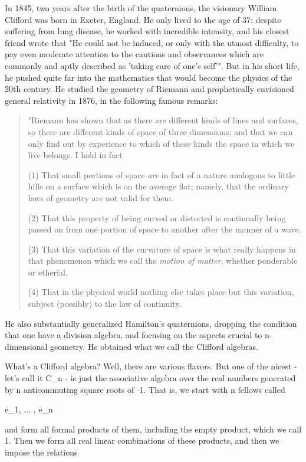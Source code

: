 In 1845, two years after the birth of the quaternions, the visionary
William Clifford was born in Exeter, England.  He only lived to
the age of 37: despite suffering from lung disease, he worked with
incredible intensity, and his closest friend wrote that "He could
not be induced, or only with the utmost difficulty, to pay even
moderate attention to the cautions and observances which are commonly
and aptly described as 'taking care of one's self'".  But
in his short life, he pushed quite far into the mathematics that
would become the physics of the 20th century.  He studied the geometry
of Riemann and prophetically envisioned general relativity in 1876, in
the following famous remarks:

\begin{quote}
"Riemann has shown that as there are different kinds of lines and
surfaces, so there are different kinds of space of three dimensions; and
that we can only find out by experience to which of these kinds the
space in which we live belongs.  I hold in fact

(1) That small portions of space \emph{are} in fact of a nature analogous
to little hills on a surface which is on the average flat; namely, that
the ordinary laws of geometry are not valid for them.

(2)  That this property of being curved or distorted is continually
being passed on from one portion of space to another after the manner of
a wave.

(3)  That this variation of the curvature of space is what really
happens in that phenomenon which we call the \emph{motion of matter},
whether ponderable or etherial.

(4)  That in the physical world nothing else takes place but this
variation, subject (possibly) to the law of continuity. 

\end{quote}
He also substantially generalized Hamilton's quaternions, dropping the
condition that one have a division algebra, and focusing on the aspects
crucial to n-dimensional geometry.  He obtained what we call the
Clifford algebras.  

What's a Clifford algebra?  Well, there are various flavors.  But one of
the nicest - let's call it C_{n} - is just the associative algebra
over the real numbers generated by n anticommuting square roots of -1.
That is, we start with n fellows called

e_{1}, ... , e_{n}

and form all formal products of them, including the empty product, which
we call 1.  Then we form all real linear combinations of these products,
and then we impose the relations

